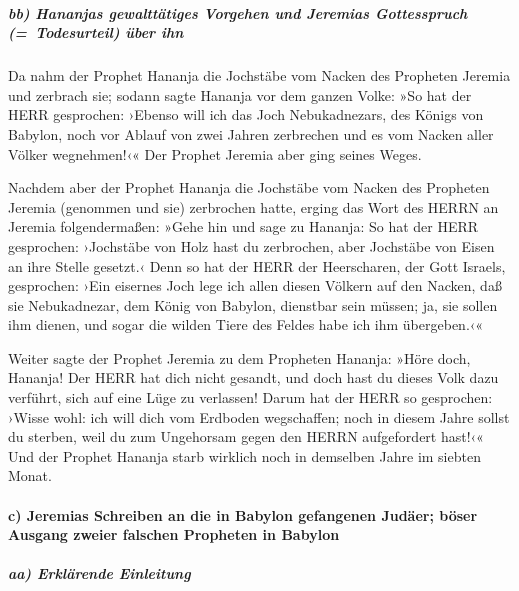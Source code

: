 \hypertarget{bb-hananjas-gewalttuxe4tiges-vorgehen-und-jeremias-gottesspruch-todesurteil-uxfcber-ihn}{%
\subparagraph{bb) Hananjas gewalttätiges Vorgehen und Jeremias
Gottesspruch (=~Todesurteil) über
ihn}\label{bb-hananjas-gewalttuxe4tiges-vorgehen-und-jeremias-gottesspruch-todesurteil-uxfcber-ihn}}

Da nahm der Prophet Hananja die Jochstäbe vom Nacken des
Propheten Jeremia und zerbrach sie; sodann sagte Hananja
vor dem ganzen Volke: »So hat der HERR gesprochen: ›Ebenso will ich das
Joch Nebukadnezars, des Königs von Babylon, noch vor Ablauf von zwei
Jahren zerbrechen und es vom Nacken aller Völker wegnehmen!‹« Der
Prophet Jeremia aber ging seines Weges.

Nachdem aber der Prophet Hananja die Jochstäbe vom Nacken
des Propheten Jeremia (genommen und sie) zerbrochen hatte, erging das
Wort des HERRN an Jeremia folgendermaßen: »Gehe hin und
sage zu Hananja: So hat der HERR gesprochen: ›Jochstäbe von Holz hast du
zerbrochen, aber Jochstäbe von Eisen an ihre Stelle gesetzt.‹
Denn so hat der HERR der Heerscharen, der Gott Israels,
gesprochen: ›Ein eisernes Joch lege ich allen diesen Völkern auf den
Nacken, daß sie Nebukadnezar, dem König von Babylon, dienstbar sein
müssen; ja, sie sollen ihm dienen, und sogar die wilden Tiere des Feldes
habe ich ihm übergeben.‹«

Weiter sagte der Prophet Jeremia zu dem Propheten
Hananja: »Höre doch, Hananja! Der HERR hat dich nicht gesandt, und doch
hast du dieses Volk dazu verführt, sich auf eine Lüge zu verlassen!
Darum hat der HERR so gesprochen: ›Wisse wohl: ich will
dich vom Erdboden wegschaffen; noch in diesem Jahre sollst du sterben,
weil du zum Ungehorsam gegen den HERRN aufgefordert hast!‹«
Und der Prophet Hananja starb wirklich noch in demselben
Jahre im siebten Monat.

\hypertarget{c-jeremias-schreiben-an-die-in-babylon-gefangenen-juduxe4er-buxf6ser-ausgang-zweier-falschen-propheten-in-babylon}{%
\paragraph{c) Jeremias Schreiben an die in Babylon gefangenen Judäer;
böser Ausgang zweier falschen Propheten in
Babylon}\label{c-jeremias-schreiben-an-die-in-babylon-gefangenen-juduxe4er-buxf6ser-ausgang-zweier-falschen-propheten-in-babylon}}

\hypertarget{aa-erkluxe4rende-einleitung}{%
\subparagraph{aa) Erklärende
Einleitung}\label{aa-erkluxe4rende-einleitung}}

